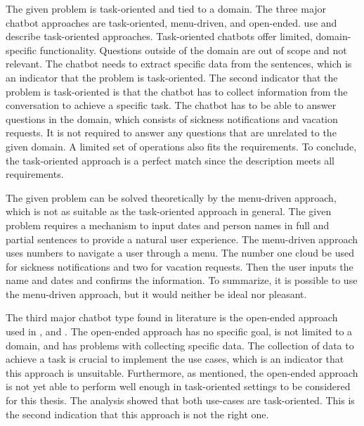 The given problem is task-oriented and tied to a domain.
The three major chatbot approaches are task-oriented, menu-driven, and open-ended. 
\citet{deshpande2017survey, luis2015williams, braunEvaluatingNLU, williams2017hybrid} use and describe task-oriented approaches.
Task-oriented chatbots offer limited, domain-specific functionality. 
Questions outside of the domain are out of scope and not relevant.
The chatbot needs to extract specific data from the sentences, which is an indicator that the problem is task-oriented.
The second indicator that the problem is task-oriented is that the chatbot has to collect information from the conversation to achieve a specific task.
The chatbot has to be able to answer questions in the domain, which consists of sickness notifications and vacation requests.
It is not required to answer any questions that are unrelated to the given domain.
A limited set of operations also fits the requirements.
To conclude, the task-oriented approach is a perfect match since the description meets all requirements.

The given problem can be solved theoretically by the menu-driven approach, which is not as suitable as the task-oriented approach in general.
The given problem requires a mechanism to input dates and person names in full and partial sentences to provide a natural user experience.
The menu-driven approach uses numbers to navigate a user through a menu.
The number one cloud be used for sickness notifications and two for vacation requests. 
Then the user inputs the name and dates and confirms the information.
To summarize, it is possible to use the menu-driven approach, but it would neither be ideal nor pleasant.

The third major chatbot type found in literature is the open-ended approach used in \citet{williams2017hybrid, bordes2016learning}, and \citet{rahman2017programming}.
The open-ended approach has no specific goal, is not limited to a domain, and has problems with collecting specific data.
The collection of data to achieve a task is crucial to implement the use cases, which is an indicator that this approach is unsuitable.
Furthermore, as \citet{bordes2016learning} mentioned, the open-ended approach is not yet able to perform well enough in task-oriented settings to be considered for this thesis.
The analysis showed that both use-cases are task-oriented.
This is the second indication that this approach is not the right one.

